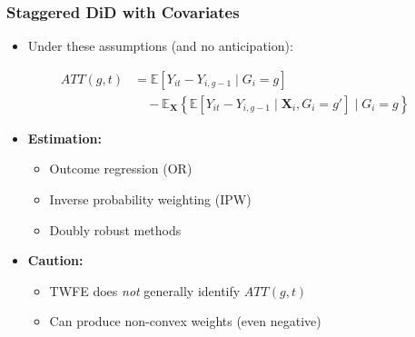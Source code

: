 \documentclass[12pt, compress]{beamer}
\begin{document}
\begin{frame}
	\frametitle{Staggered DiD with Covariates}

\begin{itemize}
	\item Under these assumptions (and no anticipation):
\end{itemize}
\begin{align*}
ATT(g,t) 
&= \mathbb{E}[Y_{it} - Y_{i,g-1} \mid G_i = g] \\
&\quad - \mathbb{E}_{\mathbf{X}}\!\left\{
\mathbb{E}[Y_{it} - Y_{i,g-1} \mid \mathbf{X}_i, G_i = g'] 
\mid G_i = g
\right\}
\end{align*}

\begin{itemize}
	\item \textbf{Estimation:}
	\begin{itemize}
		\item Outcome regression (OR)
		\item Inverse probability weighting (IPW)
		\item Doubly robust methods
	\end{itemize}
	
	\medskip
	
	\item \textbf{Caution:}
	\begin{itemize}
		\item TWFE does \textit{not} generally identify $ATT(g,t)$
		\item Can produce non-convex weights (even negative)
	\end{itemize}
\end{itemize}

\end{frame}
\end{document}
